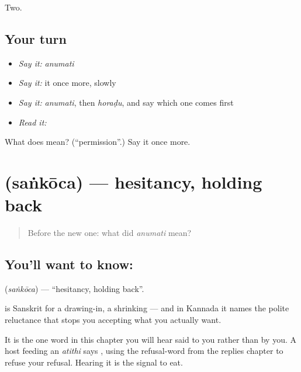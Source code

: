 \begin{grammarlens}[title={What you've built}]
Two.
\end{grammarlens}

\subsection*{Your turn}
\begin{itemize}
\raggedright
  \item \emph{Say it:} \emph{anumati}
  \item \emph{Say it:} it once more, slowly
  \item \emph{Say it:} \emph{anumati}, then \emph{horaḍu}, and say which one comes first
  \item \emph{Read it:} \textbf{}
\end{itemize}

\begin{tcolorbox}[breakable,colback=teal!4,colframe=teal!35!black,title={Before you move on}]
What does  mean? (\textquotedblleft{}permission\textquotedblright{}.) Say it once more.
\end{tcolorbox}
\section[\texorpdfstring{\kn{ಸಂಕೋಚ} (saṅkōca)}{ಸಂಕೋಚ (saṅkōca)}]{ (saṅkōca) — hesitancy, holding back}

\label{lesson:KA-C65-hesitancy}



\begin{quote}
Before the new one: what did \emph{anumati} mean?
\end{quote}

\subsection*{You'll want to know: }
\textbf{} (\emph{saṅkōca}) — \textquotedblleft{}hesitancy, holding back\textquotedblright{}.

 is Sanskrit for a drawing-in, a shrinking — and in Kannada it names the polite reluctance that stops you accepting what you actually want.

It is the one word in this chapter you will hear said to you rather than by you. A host feeding an \emph{atithi} says  , using the refusal-word from the replies chapter to refuse your refusal. Hearing it is the signal to eat.

